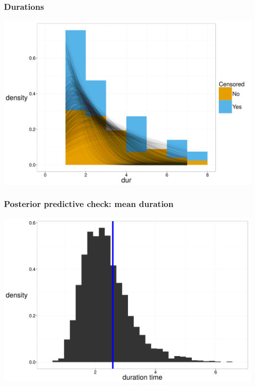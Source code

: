 \documentclass{beamer}
\begin{document}
\begin{frame}
  \frametitle{Durations}
  \begin{center}
    \includegraphics[height = 0.8\textheight, width = \textwidth, keepaspectratio = true]{figure/dur_post}
  \end{center}
\end{frame}

\begin{frame}
  \frametitle{Posterior predictive check: mean duration}
  \begin{center}
    \includegraphics[height = 0.8\textheight, width = \textwidth, keepaspectratio = true]{figure/mean_ppc}
  \end{center}
\end{frame}
\end{document}
